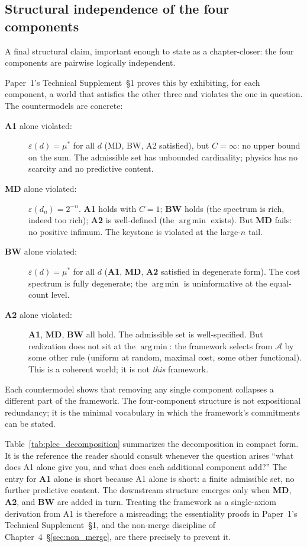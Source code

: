 \documentclass[11pt]{article}
\newcommand{\Aone}{\textbf{A1}}
\newcommand{\argmin}{\mathop{\mathrm{arg\,min}}}
\begin{document}
\subsection{Structural independence of the four components}\label{sec:four_indep}

A final structural claim, important enough to state as a chapter-closer: the four components are pairwise logically independent.

Paper~1's Technical Supplement~\S1 proves this by exhibiting, for each component, a world that satisfies the other three and violates the one in question. The countermodels are concrete:

\begin{description}
    \item[\Aone{} alone violated:] $\varepsilon(d) = \mu^*$ for all $d$ (MD, BW, A2 satisfied), but $C = \infty$: no upper bound on the sum. The admissible set has unbounded cardinality; physics has no scarcity and no predictive content.
    \item[\textbf{MD} alone violated:] $\varepsilon(d_n) = 2^{-n}$. \Aone{} holds with $C = 1$; \textbf{BW} holds (the spectrum is rich, indeed too rich); \textbf{A2} is well-defined (the $\argmin$ exists). But \textbf{MD} fails: no positive infimum. The keystone is violated at the large-$n$ tail.
    \item[\textbf{BW} alone violated:] $\varepsilon(d) = \mu^*$ for all $d$ (\Aone{}, \textbf{MD}, \textbf{A2} satisfied in degenerate form). The cost spectrum is fully degenerate; the $\argmin$ is uninformative at the equal-count level.
    \item[\textbf{A2} alone violated:] \Aone{}, \textbf{MD}, \textbf{BW} all hold. The admissible set is well-specified. But realization does not sit at the $\argmin$: the framework selects from $\mathcal{A}$ by some other rule (uniform at random, maximal cost, some other functional). This is a coherent world; it is not \emph{this} framework.
\end{description}

\noindent Each countermodel shows that removing any single component collapses a different part of the framework. The four-component structure is not expositional redundancy; it is the minimal vocabulary in which the framework's commitments can be stated.

Table~\ref{tab:plec_decomposition} summarizes the decomposition in compact form. It is the reference the reader should consult whenever the question arises ``what does A1 alone give you, and what does each additional component add?'' The entry for \textbf{A1} alone is short because A1 alone is short: a finite admissible set, no further predictive content. The downstream structure emerges only when \textbf{MD}, \textbf{A2}, and \textbf{BW} are added in turn. Treating the framework as a single-axiom derivation from A1 is therefore a misreading; the essentiality proofs in Paper~1's Technical Supplement~\S1, and the non-merge discipline of Chapter~4~\S\ref{sec:non_merge}, are there precisely to prevent it.
\end{document}
